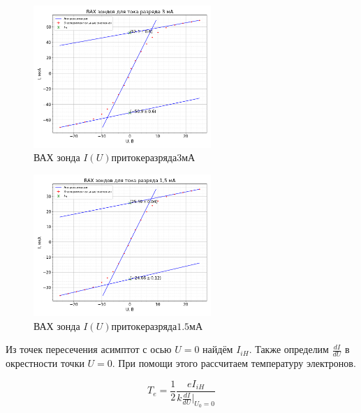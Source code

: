\documentclass[a4paper, 12pt]{article}
\begin{document}
            \begin{figure}[!ht]
                \centering
                \includegraphics[width=0.6\textwidth]{img/vah_zond_3ma.png}
                \caption{ВАХ зонда $I(U) при токе разряда 3 мА$}
                \label{plot:vah_zond_3ma}
            \end{figure}

            \begin{figure}[!ht]
                \centering
                \includegraphics[width=0.6\textwidth]{img/vah_zond_15ma.png}
                \caption{ВАХ зонда $I(U) при токе разряда 1.5 мА$}
                \label{plot:vah_zond_15ma}
            \end{figure}

            Из точек пересечения асимптот с осью $U = 0$ найдём $I_{iH}$. Также определим $\frac{dI}{dU}$ в окрестности точки $U = 0$. При помощи этого рассчитаем температуру электронов.

            $$
                T_e = \frac{1}{2} \frac{e I_{iH}}{k \frac{dI}{dU} \vert_{U_0=0}}
            $$
\end{document}
